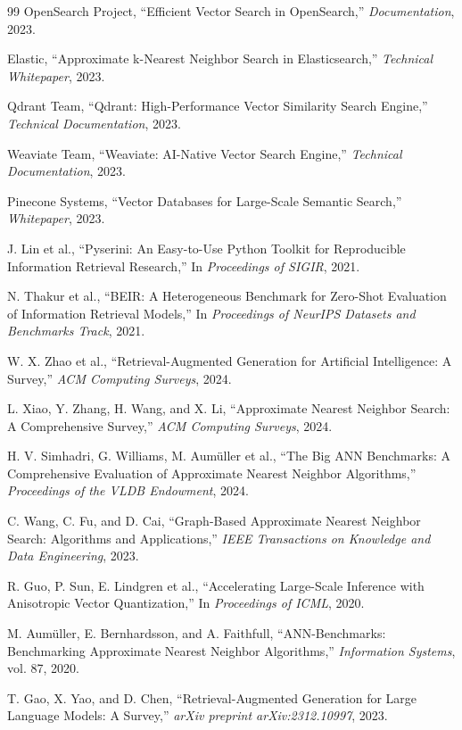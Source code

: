 \documentclass{ieeeaccess}
\begin{document}
\begin{thebibliography}{99}
OpenSearch Project,
``Efficient Vector Search in OpenSearch,''
\emph{Documentation}, 2023.

Elastic,
``Approximate k-Nearest Neighbor Search in Elasticsearch,''
\emph{Technical Whitepaper}, 2023.

Qdrant Team,
``Qdrant: High-Performance Vector Similarity Search Engine,''
\emph{Technical Documentation}, 2023.

Weaviate Team,
``Weaviate: AI-Native Vector Search Engine,''
\emph{Technical Documentation}, 2023.

Pinecone Systems,
``Vector Databases for Large-Scale Semantic Search,''
\emph{Whitepaper}, 2023.

J. Lin et al.,
``Pyserini: An Easy-to-Use Python Toolkit for Reproducible Information Retrieval Research,''
In \emph{Proceedings of SIGIR}, 2021.

N. Thakur et al.,
``BEIR: A Heterogeneous Benchmark for Zero-Shot Evaluation of Information Retrieval Models,''
In \emph{Proceedings of NeurIPS Datasets and Benchmarks Track}, 2021.

W. X. Zhao et al.,
``Retrieval-Augmented Generation for Artificial Intelligence: A Survey,''
\emph{ACM Computing Surveys}, 2024.

L. Xiao, Y. Zhang, H. Wang, and X. Li,
``Approximate Nearest Neighbor Search: A Comprehensive Survey,''
\emph{ACM Computing Surveys}, 2024.

H. V. Simhadri, G. Williams, M. Aum\"uller et al.,
``The Big ANN Benchmarks: A Comprehensive Evaluation of Approximate Nearest Neighbor Algorithms,''
\emph{Proceedings of the VLDB Endowment}, 2024.

C. Wang, C. Fu, and D. Cai,
``Graph-Based Approximate Nearest Neighbor Search: Algorithms and Applications,''
\emph{IEEE Transactions on Knowledge and Data Engineering}, 2023.

R. Guo, P. Sun, E. Lindgren et al.,
``Accelerating Large-Scale Inference with Anisotropic Vector Quantization,''
In \emph{Proceedings of ICML}, 2020.

M. Aum\"uller, E. Bernhardsson, and A. Faithfull,
``ANN-Benchmarks: Benchmarking Approximate Nearest Neighbor Algorithms,''
\emph{Information Systems}, vol. 87, 2020.

T. Gao, X. Yao, and D. Chen,
``Retrieval-Augmented Generation for Large Language Models: A Survey,''
\emph{arXiv preprint arXiv:2312.10997}, 2023.


\end{thebibliography}
\end{document}
